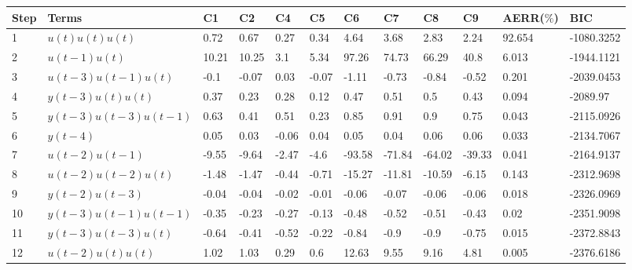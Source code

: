 \begin{tabular}{llllllllllll}
Step & Terms & C1 & C2 & C4 & C5 & C6 & C7 & C8 & C9 & AERR($\%$) & BIC \\ 
\hline 
1 & $u(t)u(t)u(t)$ & 0.72 & 0.67 & 0.27 & 0.34 & 4.64 & 3.68 & 2.83 & 2.24 & 92.654 & -1080.3252 \\ 
2 & $u(t-1)u(t)$ & 10.21 & 10.25 & 3.1 & 5.34 & 97.26 & 74.73 & 66.29 & 40.8 & 6.013 & -1944.1121 \\ 
3 & $u(t-3)u(t-1)u(t)$ & -0.1 & -0.07 & 0.03 & -0.07 & -1.11 & -0.73 & -0.84 & -0.52 & 0.201 & -2039.0453 \\ 
4 & $y(t-3)u(t)u(t)$ & 0.37 & 0.23 & 0.28 & 0.12 & 0.47 & 0.51 & 0.5 & 0.43 & 0.094 & -2089.97 \\ 
5 & $y(t-3)u(t-3)u(t-1)$ & 0.63 & 0.41 & 0.51 & 0.23 & 0.85 & 0.91 & 0.9 & 0.75 & 0.043 & -2115.0926 \\ 
6 & $y(t-4)$ & 0.05 & 0.03 & -0.06 & 0.04 & 0.05 & 0.04 & 0.06 & 0.06 & 0.033 & -2134.7067 \\ 
7 & $u(t-2)u(t-1)$ & -9.55 & -9.64 & -2.47 & -4.6 & -93.58 & -71.84 & -64.02 & -39.33 & 0.041 & -2164.9137 \\ 
8 & $u(t-2)u(t-2)u(t)$ & -1.48 & -1.47 & -0.44 & -0.71 & -15.27 & -11.81 & -10.59 & -6.15 & 0.143 & -2312.9698 \\ 
9 & $y(t-2)u(t-3)$ & -0.04 & -0.04 & -0.02 & -0.01 & -0.06 & -0.07 & -0.06 & -0.06 & 0.018 & -2326.0969 \\ 
10 & $y(t-3)u(t-1)u(t-1)$ & -0.35 & -0.23 & -0.27 & -0.13 & -0.48 & -0.52 & -0.51 & -0.43 & 0.02 & -2351.9098 \\ 
11 & $y(t-3)u(t-3)u(t)$ & -0.64 & -0.41 & -0.52 & -0.22 & -0.84 & -0.9 & -0.9 & -0.75 & 0.015 & -2372.8843 \\ 
12 & $u(t-2)u(t)u(t)$ & 1.02 & 1.03 & 0.29 & 0.6 & 12.63 & 9.55 & 9.16 & 4.81 & 0.005 & -2376.6186 \\ 
\hline 
\end{tabular}